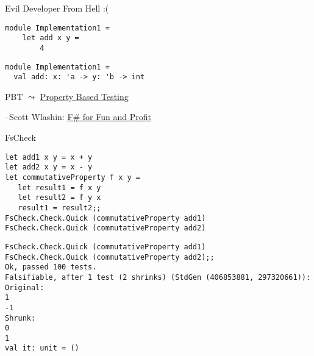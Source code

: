 \documentclass[t]{beamer}
\begin{document}
\begin{frame}[label={sec:org417ed81},fragile]{Evil Developer From Hell :(}
 \begin{verbatim}
module Implementation1 =
    let add x y =
        4
\end{verbatim}

\begin{verbatim}
module Implementation1 =
  val add: x: 'a -> y: 'b -> int
\end{verbatim}
\end{frame}

\begin{frame}[label={sec:orgd769589}]{PBT}
\(\leadsto\) \href{./4.2 An introduction to property based testing.pdf}{Property Based Testing}

\null\hfill--Scott Wlashin: \href{https://fsharpforfunandprofit.com/series/property-based-testing/}{F\# for Fun and Profit}
\end{frame}

\begin{frame}[label={sec:org7e44b6f},fragile]{FsCheck}
 \begin{verbatim}
let add1 x y = x + y
let add2 x y = x - y
let commutativeProperty f x y =
   let result1 = f x y
   let result2 = f y x
   result1 = result2;;
FsCheck.Check.Quick (commutativeProperty add1)
FsCheck.Check.Quick (commutativeProperty add2)
\end{verbatim}

\begin{verbatim}
FsCheck.Check.Quick (commutativeProperty add1)
FsCheck.Check.Quick (commutativeProperty add2);;
Ok, passed 100 tests.
Falsifiable, after 1 test (2 shrinks) (StdGen (406853881, 297320661)):
Original:
1
-1
Shrunk:
0
1
val it: unit = ()
\end{verbatim}
\end{frame}
\end{document}
